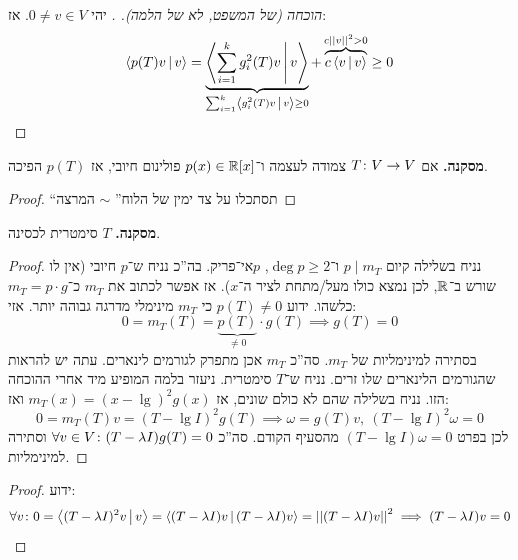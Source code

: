 \documentclass[]{../../../../tex/classes/styledArticle}
\begin{document}
    \begin{proof}[הוכחה (של המשפט, לא של הלמה). ]
        יהי $0 \neq v \in V$. אז: 
        \[ \mut{p(T)v}{v} = \underbrace{\mut{\sum_{i = 1}^{k}g_i^2(T)v}{v}}_{\mathclap{\sum_{i = 1}^{k} \mut{g_i^2(T)v}{v}\ge 0}} + \overbrace{c\mut{v}{v}}^{c\norm{v}^2 > 0} \ge 0 \]
    \end{proof}
    \textbf{מסקנה. }אם $T \colon V \to V$ צמודה לעצמה ו־$p(x) \in \mathbb{R}[x]$ פולינום חיובי, אז $p(T)$ הפיכה. 
    \begin{proof}
        ``תסתכלו על צד ימין של הלוח'' $\sim$ המרצה
    \end{proof}
    \textbf{מסקנה. }$T$ סימטרית לכסינה. 
    \begin{proof}
        נניח בשלילה קיום $p \mid m_T$ ו־$\deg p \ge 2$, $p $אי־פריק. בה''כ נניח ש־$p$ חיובי (אין לו שורש ב־$\mathbb{R}$, לכן נמצא כולו מעל/מתחת לציר ה־$x$). אז אפשר לכתוב את $m_T$ כ־$m_T = p \cdot g$ כלשהו. ידוע $p(T) \neq 0$ כי $m_T$ מינימלי מדרגה גבוהה יותר. 
        אזי: 
        \[ 0 = m_T(T) = \underbrace{p(T)}_{\neq 0} \cdot g(T) \implies g(T) = 0 \]
        בסתירה למינימליות של $m_T$. סה''כ $m_T$ אכן מתפרק לגורמים לינארים. עתה יש להראות שהגורמים הלינארים שלו זרים. נניח ש־$T$ סימטרית. ניעזר בלמה המופיע מיד אחרי ההוכחה הזו. נניח בשלילה שהם לא כולם שונים, אז $m_T(x) = (x - \lg)^2g(x)$ ואז: 
        \[ 0 = m_T(T)v = (T - \lg I)^{2}g(T) \implies \omega = g(T)v, \ (T - \lg I)^2\omega = 0 \]
        לכן בפרט $(T - \lg I)\omega = 0$ מהסעיף הקודם. סה''כ $\forall v \in V \colon (T - \lambda I)g(T) = 0$ וסתירה למינימליות. 
    \end{proof}
    \begin{proof}
        ידוע: 
        \[ \forall v \colon 0 = \left \langle (T - \lambda I)^{2}v \,\middle|\, v \right \rangle = \left \langle (T - \lambda I)v \,\middle|\, (T - \lambda I)v \right \rangle = \left \vert \left \vert (T - \lambda I)v \right \vert \right \vert^2 \implies (T - \lambda I)v = 0 \]
    \end{proof}

    
    
    
    
    \ndoc
\end{document}

